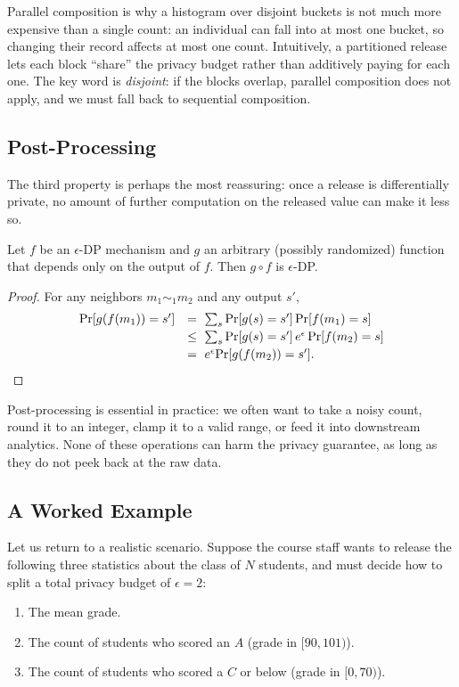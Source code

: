 \documentclass[11pt]{article}
\newcommand{\pr}{\mathrm{Pr}}
\begin{document}
Parallel composition is why a histogram over disjoint buckets is not much
more expensive than a single count: an individual can fall into at most one
bucket, so changing their record affects at most one count.  Intuitively, a
partitioned release lets each block ``share'' the privacy budget rather than
additively paying for each one.  The key word is \emph{disjoint}: if the
blocks overlap, parallel composition does not apply, and we must fall back
to sequential composition.

\subsection{Post-Processing}

The third property is perhaps the most reassuring: once a release is
differentially private, no amount of further computation on the released
value can make it less so.

\begin{theorem}
\label{thm:post-proc}
Let $f$ be an $\epsilon$-DP mechanism and $g$ an arbitrary (possibly
randomized) function that depends only on the output of $f$.  Then
$g \circ f$ is $\epsilon$-DP.
\end{theorem}

\begin{proof}
For any neighbors $m_1 \sim_1 m_2$ and any output $s'$,
\[
\begin{array}{rl}
  \pr[g(f(m_1)) = s']
  &=\ \sum_s \pr[g(s) = s']\,\pr[f(m_1) = s] \\[0.5ex]
  &\leq\ \sum_s \pr[g(s) = s']\, e^\epsilon\, \pr[f(m_2) = s] \\[0.5ex]
  &=\ e^\epsilon \pr[g(f(m_2)) = s']. \qedhere
\end{array}
\]
\end{proof}

Post-processing is essential in practice: we often want to take a noisy
count, round it to an integer, clamp it to a valid range, or feed it into
downstream analytics.  None of these operations can harm the privacy
guarantee, as long as they do not peek back at the raw data.

\subsection{A Worked Example}

Let us return to a realistic scenario.  Suppose the course staff wants to
release the following three statistics about the class of $N$ students, and
must decide how to split a total privacy budget of $\epsilon = 2$:
\begin{enumerate}
\item[(a)] The mean grade.
\item[(b)] The count of students who scored an $A$ (grade in $[90, 101)$).
\item[(c)] The count of students who scored a $C$ or below (grade in
  $[0, 70)$).
\end{enumerate}
\end{document}
